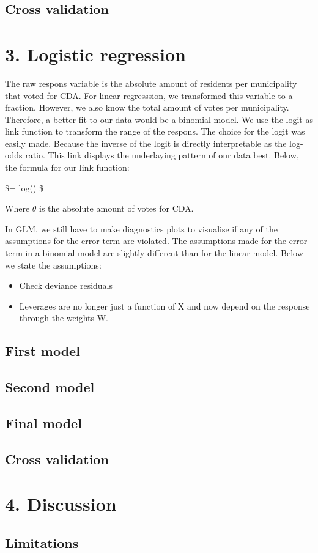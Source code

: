 \documentclass[11pt,]{article}
\begin{document}
\subsection{Cross validation}\label{cross-validation}

\section{3. Logistic regression}\label{logistic-regression}

The raw respons variable is the absolute amount of residents per
municipality that voted for CDA. For linear regresssion, we transformed
this variable to a fraction. However, we also know the total amount of
votes per municipality. Therefore, a better fit to our data would be a
binomial model. We use the logit as link function to transform the range
of the respons. The choice for the logit was easily made. Because the
inverse of the logit is directly interpretable as the log-odds ratio.
This link displays the underlaying pattern of our data best. Below, the
formula for our link function:

\$\eta = log() \$

Where \(\theta\) is the absolute amount of votes for CDA.

In GLM, we still have to make diagnostics plots to visualise if any of
the assumptions for the error-term are violated. The assumptions made
for the error-term in a binomial model are slightly different than for
the linear model. Below we state the assumptions:

\begin{itemize}
\item[] Check deviance residuals
\item[] Leverages are no longer just a function of X and now depend on the response through the weights W.
\end{itemize}

\subsection{First model}\label{first-model-1}

\subsection{Second model}\label{second-model}

\subsection{Final model}\label{final-model-1}

\subsection{Cross validation}\label{cross-validation-1}

\section{4. Discussion}\label{discussion}

\subsection{Limitations}\label{limitations}
\end{document}
